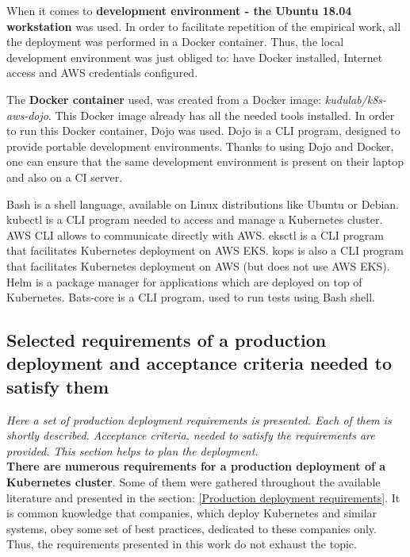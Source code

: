 When it comes to \textbf{development environment - the Ubuntu 18.04 workstation} was used. In order to facilitate repetition of the empirical work, all the deployment was performed in a Docker container. Thus, the local development environment was just obliged to: have Docker installed, Internet access and AWS credentials configured.

The \textbf{Docker container} used, was created from a Docker image: \textit{kudulab/k8s-aws-dojo}\cite{gh-k8s-aws-dojo}. This Docker image already has all the needed tools installed. In order to run this Docker container, Dojo was used. Dojo is a CLI program, designed to provide portable development environments\cite{gh-dojo}. Thanks to using Dojo and Docker, one can ensure that the same development environment is present on their laptop and also on a CI server.

Bash is a shell language, available on Linux distributions like Ubuntu or Debian. kubectl is a CLI program needed to access and manage a Kubernetes cluster\cite{kubectl}. AWS CLI allows to communicate directly with AWS. eksctl is a CLI program that facilitates Kubernetes deployment on AWS EKS\cite{eksctl}. kops is also a CLI program that facilitates Kubernetes deployment on AWS (but does not use AWS EKS)\cite{online-kops}. Helm is a package manager for applications which are deployed on top of Kubernetes\cite{helm}. Bats-core is a CLI program, used to run tests using Bash shell\cite{bats-core}.

\subsection{Selected requirements of a production deployment and acceptance criteria needed to satisfy them}
\textit{Here a set of production deployment requirements is presented. Each of them is shortly described. Acceptance criteria, needed to satisfy the requirements are provided. This section helps to plan the deployment.}
\\

\textbf{There are numerous requirements for a production deployment of a Kubernetes cluster}. Some of them were gathered throughout the available literature and presented in the section: \ref{Production deployment requirements}. It is common knowledge that companies, which deploy Kubernetes and similar systems, obey some set of best practices, dedicated to these companies only. Thus, the requirements presented in this work do not exhaust the topic.

